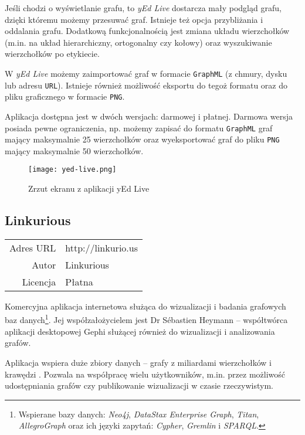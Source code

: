 Jeśli chodzi o wyświetlanie grafu, to \textit{yEd Live} dostarcza mały podgląd grafu, dzięki któremu możemy przesuwać graf. Istnieje też opcja przybliżania i oddalania grafu. Dodatkową funkcjonalnością jest zmiana układu wierzchołków (m.in. na układ hierarchiczny, ortogonalny czy kołowy) oraz wyszukiwanie wierzchołków po etykiecie.

W \textit{yEd Live} możemy zaimportować graf w formacie \texttt{GraphML} (z chmury, dysku lub adresu \texttt{URL}). Istnieje również możliwość eksportu do tegoż formatu oraz do pliku graficznego w formacie \texttt{PNG}. 

Aplikacja dostępna jest w dwóch wersjach: darmowej i płatnej. Darmowa wersja posiada pewne ograniczenia, np. możemy zapisać do formatu \texttt{GraphML} graf mający maksymalnie 25 wierzchołków oraz wyeksportować graf do pliku \texttt{PNG} mający maksymalnie 50 wierzchołków. 

\begin{figure}[H]
\centering
\texttt{[image: yed-live.png]}
\caption{Zrzut ekranu z aplikacji yEd Live}
\end{figure}


\subsection*{Linkurious}
\bigskip
\noindent\begin{tabularx}{\textwidth}{r|X|}
\cline{2-2}
  Adres URL & http://linkurio.us \\ 
\cline{2-2} 
 Autor & Linkurious\\ 
\cline{2-2}
 Licencja & Płatna\\ 
\cline{2-2}
\end{tabularx}
\bigskip

Komercyjna aplikacja internetowa służąca do wizualizacji i badania grafowych baz danych\footnote{Wspierane bazy danych: \textit{Neo4j}, \textit{DataStax Enterprise Graph}, \textit{Titan}, \textit{AllegroGraph} oraz ich języki zapytań: \textit{Cypher}, \textit{Gremlin} i \textit{SPARQL}.}. Jej współzałożycielem jest Dr Sébastien Heymann -- współtwórca aplikacji desktopowej Gephi służącej również do wizualizacji i analizowania grafów. 

Aplikacja wspiera duże zbiory danych -- grafy z miliardami wierzchołków i krawędzi \cite{linkurious}. Pozwala na współpracę wielu użytkowników, m.in. przez możliwość udostępniania grafów czy publikowanie wizualizacji w czasie rzeczywistym. 

